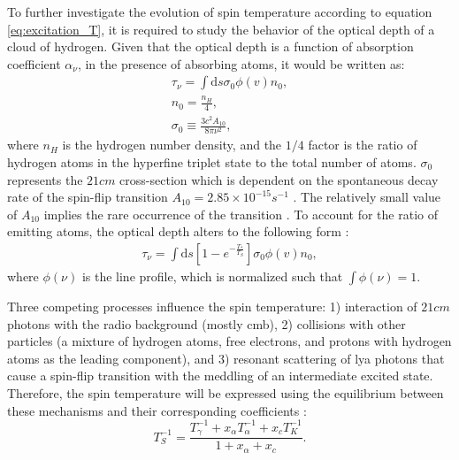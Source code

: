 \documentclass[12pt, TexShade, letterpaper]{report}
\begin{document}

To further investigate the evolution of spin temperature according to equation \ref{eq:excitation_T}, it is required to study the behavior of the optical depth of a cloud of hydrogen. Given that the optical depth is a function of absorption coefficient $\alpha_\nu$, in the presence of absorbing atoms, it would be written as:
\begin{gather}
    \tau_\nu=\int \mathrm{d} s \sigma_0 \phi(v) n_0 ,\\
    n_0 =\frac{n_H}{4},\\
    \sigma_0 \equiv \frac{3c^2 A_{10}}{8\pi \nu^2},
\end{gather}
where $n_H$ is the hydrogen number density, and the $1/4$ factor is the ratio of hydrogen atoms in the hyperfine triplet state to the total number of atoms. $\sigma_0$ represents the $21cm$ cross-section which is dependent on the spontaneous decay rate of the spin-flip transition $A_{10} = 2.85 \times 10^{-15} s^{-1}$ \cite{21century, low_frequency}. The relatively small value of $A_{10}$ implies the rare occurrence of the transition \cite{kit_thesis}. To account for the ratio of emitting atoms, the optical depth alters to the following form \cite{21century, low_frequency}:
\begin{gather}
    \tau_\nu=\int \mathrm{d} s\left[1- e^{ -\frac {T_*}{ T_S}}\right] \sigma_0 \phi(v) n_0 ,
\end{gather}
where $\phi(\nu)$ is the line profile, which is normalized such that $\int \phi \left(\nu\right) =1$. \par
Three competing processes influence the spin temperature: 1) interaction of $21cm$ photons with the radio background (mostly \gls{cmb}), 2) collisions with other particles (a mixture of hydrogen atoms, free electrons, and protons with hydrogen atoms as the leading component), and 3) resonant scattering of \gls{lya} photons that cause a spin-flip transition with the meddling of an intermediate excited state. Therefore, the spin temperature will be expressed using the equilibrium between these mechanisms and their corresponding coefficients \cite{low_frequency,21century}:
\begin{equation}
    T^{-1}_S = \frac{T^{-1}_\gamma + x_\alpha T^{-1}_\alpha + x_c T^{-1}_K}{1 + x_\alpha + x_c}. \label{eq:spin_temperature_coupling}
\end{equation}
\end{document}
